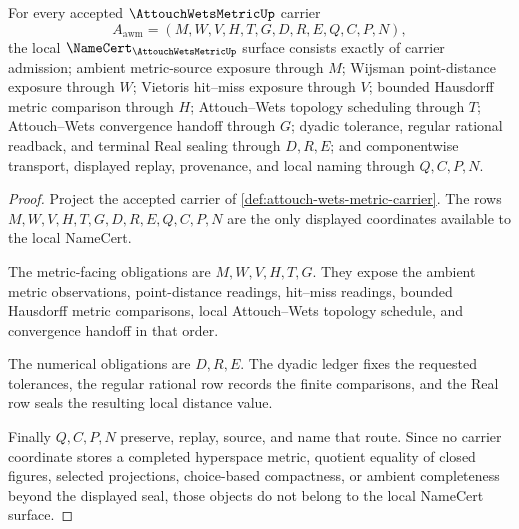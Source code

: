 \begin{theorem}
\label{thm:attouch-wets-metric-namecert-obligations}
For every accepted $\AttouchWetsMetricUp$ carrier
$$
A_{\mathrm{awm}}=(M,W,V,H,T,G,D,R,E,Q,C,P,N),
$$
the local $\NameCert_{\AttouchWetsMetricUp}$ surface consists exactly of carrier admission; ambient metric-source exposure through $M$; Wijsman point-distance exposure through $W$; Vietoris hit--miss exposure through $V$; bounded Hausdorff metric comparison through $H$; Attouch--Wets topology scheduling through $T$; Attouch--Wets convergence handoff through $G$; dyadic tolerance, regular rational readback, and terminal Real sealing through $D,R,E$; and componentwise transport, displayed replay, provenance, and local naming through $Q,C,P,N$.
\end{theorem}
\begin{proof}
Project the accepted carrier of \autoref{def:attouch-wets-metric-carrier}. The rows $M,W,V,H,T,G,D,R,E,Q,C,P,N$ are the only displayed coordinates available to the local NameCert.

The metric-facing obligations are $M,W,V,H,T,G$. They expose the ambient metric observations, point-distance readings, hit--miss readings, bounded Hausdorff metric comparisons, local Attouch--Wets topology schedule, and convergence handoff in that order.

The numerical obligations are $D,R,E$. The dyadic ledger fixes the requested tolerances, the regular rational row records the finite comparisons, and the Real row seals the resulting local distance value.

Finally $Q,C,P,N$ preserve, replay, source, and name that route. Since no carrier coordinate stores a completed hyperspace metric, quotient equality of closed figures, selected projections, choice-based compactness, or ambient completeness beyond the displayed seal, those objects do not belong to the local NameCert surface.
\end{proof}

